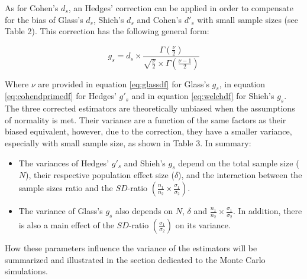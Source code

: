 \documentclass[
  man,floatsintext]{apa6}
\providecommand{\tightlist}{%
  \setlength{\itemsep}{0pt}\setlength{\parskip}{0pt}}
\begin{document}
As for Cohen's \(d_s\), an Hedges' correction can be applied in order to compensate for the bias of Glass's \(d_s\), Shieh's \(d_s\) and Cohen's \(d'_s\) with small sample sizes (see Table 2). This correction has the following general form:

\begin{equation} 
g_s = d_s \times \frac{\Gamma(\frac{\nu}{2})}{\sqrt{\frac{\nu}{2}} \times \Gamma(\frac{\nu-1}{2})}
\label{eq:Hedgesgs}
\end{equation}

Where \(\nu\) are provided in equation \ref{eq:glassdf} for Glass's \(g_s\), in equation \ref{eq:cohendprimedf} for Hedges' \(g'_s\) and in equation \ref{eq:welchdf} for Shieh's \(g_s\). The three corrected estimators are theoretically unbiased when the assumptions of normality is met. Their variance are a function of the same factors as their biased equivalent, however, due to the correction, they have a smaller variance, especially with small sample size, as shown in Table 3. In summary:

\begin{itemize}
\tightlist
\item
  The variances of Hedges' \(g'_s\) and Shieh's \(g_s\) depend on the total sample size (\(N\)), their respective population effect size (\(\delta\)), and the interaction between the sample sizes ratio and the \(SD\)-ratio \(\left(\frac{n_1}{n_2}\times\frac{\sigma_1}{\sigma_2} \right)\).\\
\item
  The variance of Glass's \(g_s\) also depends on \(N\), \(\delta\) and \(\frac{n_1}{n_2}\times\frac{\sigma_1}{\sigma_2}\). In addition, there is also a main effect of the \(SD\)-ratio \(\left(\frac{\sigma_1}{\sigma_2} \right)\) on its variance.
\end{itemize}

How these parameters influence the variance of the estimators will be summarized and illustrated in the section dedicated to the Monte Carlo simulations.
\end{document}
